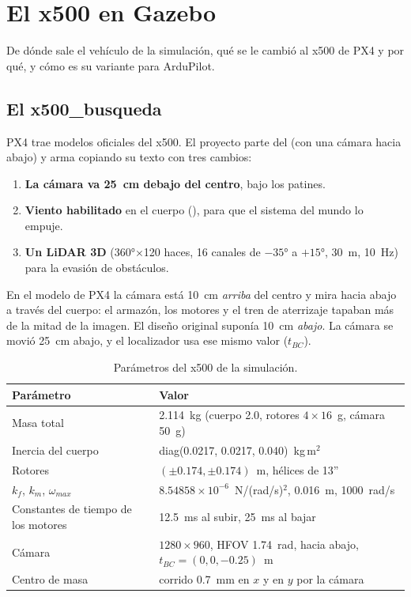 \chapter{El x500 en Gazebo}
\label{cap:x500}

\begin{enpocas}
De dónde sale el vehículo de la simulación, qué se le cambió al x500 de PX4 y por qué, y cómo es su
variante para ArduPilot.
\end{enpocas}

\section{El x500\_busqueda}

PX4 trae modelos oficiales del x500. El proyecto parte del  (con una cámara
hacia abajo) y  arma  copiando su texto con tres
cambios:
\begin{enumerate}
  \item \textbf{La cámara va 25~cm debajo del centro}, bajo los patines.
  \item \textbf{Viento habilitado} en el cuerpo (), para que el sistema
         del mundo lo empuje.
  \item \textbf{Un LiDAR 3D} (360°$\times$120 haces, 16 canales de $-35$° a $+15$°, 30~m, 10~Hz) para la
        evasión de obstáculos.
\end{enumerate}

\begin{leccion}
En el modelo de PX4 la cámara está 10~cm \emph{arriba} del centro y mira hacia abajo a través del
cuerpo: el armazón, los motores y el tren de aterrizaje tapaban más de la mitad de la imagen. El diseño
original suponía 10~cm \emph{abajo}. La cámara se movió 25~cm abajo, y el localizador usa ese mismo valor
($t_{BC}$).
\end{leccion}

\begin{table}[H]
\centering\small
\begin{tabular}{ll}
\toprule
\textbf{Parámetro} & \textbf{Valor} \\ \midrule
Masa total & 2.114~kg (cuerpo 2.0, rotores $4\times16$~g, cámara 50~g) \\
Inercia del cuerpo & diag(0.0217, 0.0217, 0.040)~kg\,m$^2$ \\
Rotores & $(\pm0.174, \pm0.174)$~m, hélices de 13'' \\
$k_f$, $k_m$, $\omega_{max}$ & $8.54858\times10^{-6}$~N/(rad/s)$^2$, 0.016~m, 1000~rad/s \\
Constantes de tiempo de los motores & 12.5~ms al subir, 25~ms al bajar \\
Cámara & $1280\times960$, HFOV 1.74~rad, hacia abajo, $t_{BC} = (0, 0, -0.25)$~m \\
Centro de masa & corrido 0.7~mm en $x$ y en $y$ por la cámara \\
\bottomrule
\end{tabular}
\caption{Parámetros del x500 de la simulación.}
\end{table}

